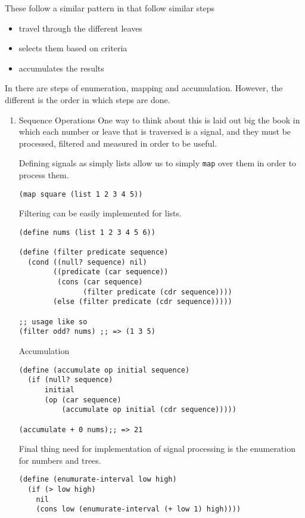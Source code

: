 \documentclass[11pt]{article}
\begin{document}
These follow a similar pattern in that follow similar steps

\begin{itemize}
\item travel through the different leaves
\item selects them based on criteria
\item accumulates the results
\end{itemize}

In there are steps of enumeration, mapping and accumulation. However,
the different is the order in which steps are done.

\begin{enumerate}
\item Sequence Operations
\label{sec:org01dc09a}
One way to think about this is laid out big the book in which each
number or leave that is traversed is a signal, and they must be
processed, filtered and measured in order to be useful.

Defining signals as simply lists allow us to simply \texttt{map} over them in
order to process them.

\begin{verbatim}
(map square (list 1 2 3 4 5))
\end{verbatim}

Filtering can be easily implemented for lists.

\begin{verbatim}
(define nums (list 1 2 3 4 5 6))

(define (filter predicate sequence)
  (cond ((null? sequence) nil)
        ((predicate (car sequence))
         (cons (car sequence)
               (filter predicate (cdr sequence))))
        (else (filter predicate (cdr sequence)))))

;; usage like so
(filter odd? nums) ;; => (1 3 5)
\end{verbatim}

Accumulation

\begin{verbatim}
(define (accumulate op initial sequence)
  (if (null? sequence)
      initial
      (op (car sequence)
          (accumulate op initial (cdr sequence)))))

(accumulate + 0 nums);; => 21
\end{verbatim}

Final thing need for implementation of signal processing is the
enumeration for numbers and trees.

\begin{verbatim}
(define (enumurate-interval low high)
  (if (> low high)
    nil
    (cons low (enumurate-interval (+ low 1) high))))


\end{verbatim}
\end{enumerate}
\end{document}
